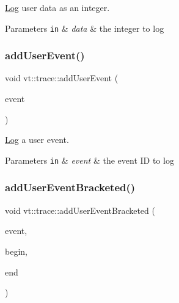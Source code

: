 \hyperlink{structvt_1_1trace_1_1_log}{Log} user data as an integer. 


\begin{DoxyParams}[1]{Parameters}
\mbox{\tt in}  & {\em data} & the integer to log \\
\hline
\end{DoxyParams}
\mbox{\label{namespacevt_1_1trace_ac973a9573bd3cc0a3fead674a4551ac5}} 
\subsubsection{\texorpdfstring{add\+User\+Event()}{addUserEvent()}}
{\footnotesize\ttfamily void vt\+::trace\+::add\+User\+Event (\begin{DoxyParamCaption}\item[{\hyperlink{namespacevt_1_1trace_a5908920d051c144c89f17c69ed262350}{User\+Event\+I\+D\+Type}}]{event }\end{DoxyParamCaption})}



\hyperlink{structvt_1_1trace_1_1_log}{Log} a user event. 


\begin{DoxyParams}[1]{Parameters}
\mbox{\tt in}  & {\em event} & the event ID to log \\
\hline
\end{DoxyParams}
\mbox{\label{namespacevt_1_1trace_a2a7cf2ad5c08611bbb348066c7c8ae8f}} 
\subsubsection{\texorpdfstring{add\+User\+Event\+Bracketed()}{addUserEventBracketed()}\hspace{0.1cm}{\footnotesize\ttfamily [1/2]}}
{\footnotesize\ttfamily void vt\+::trace\+::add\+User\+Event\+Bracketed (\begin{DoxyParamCaption}\item[{\hyperlink{namespacevt_1_1trace_a5908920d051c144c89f17c69ed262350}{User\+Event\+I\+D\+Type}}]{event,  }\item[{\hyperlink{namespacevt_a2b9f28078dc309ad0706b69ded743e69}{Time\+Type}}]{begin,  }\item[{\hyperlink{namespacevt_a2b9f28078dc309ad0706b69ded743e69}{Time\+Type}}]{end }\end{DoxyParamCaption})}

